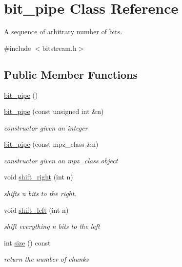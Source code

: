 \hypertarget{classbit__pipe}{}\section{bit\+\_\+pipe Class Reference}
\label{classbit__pipe}


A sequence of arbitrary number of bits.  




{\ttfamily \#include $<$bitstream.\+h$>$}

\subsection*{Public Member Functions}
\begin{DoxyCompactItemize}
\item 
\hyperlink{classbit__pipe_a6dab67e6a47c1d1f020fe769df27cef1}{bit\+\_\+pipe} ()
\item 
\hyperlink{classbit__pipe_a381c4371859988c65802767d31fc7458}{bit\+\_\+pipe} (const unsigned int \&n)
\begin{DoxyCompactList}\small\item\em constructor given an integer \end{DoxyCompactList}\item 
\hyperlink{classbit__pipe_adc311ad05b01a2ec6e979882aa8b703e}{bit\+\_\+pipe} (const mpz\+\_\+class \&n)
\begin{DoxyCompactList}\small\item\em constructor given an mpz\+\_\+class object \end{DoxyCompactList}\item 
void \hyperlink{classbit__pipe_a341a1f62d728a67f730503ca722a7770}{shift\+\_\+right} (int n)
\begin{DoxyCompactList}\small\item\em shifts n bits to the right. \end{DoxyCompactList}\item 
void \hyperlink{classbit__pipe_a148fab2b6b3ee730fbaa52539d5a4d74}{shift\+\_\+left} (int n)
\begin{DoxyCompactList}\small\item\em shift everything n bits to the left \end{DoxyCompactList}\item 
int \hyperlink{classbit__pipe_a4bdc57f1f598bfad0eaa40860f17000c}{size} () const
\begin{DoxyCompactList}\small\item\em return the number of chunks \end{DoxyCompactList}\item 

\end{DoxyCompactItemize}
